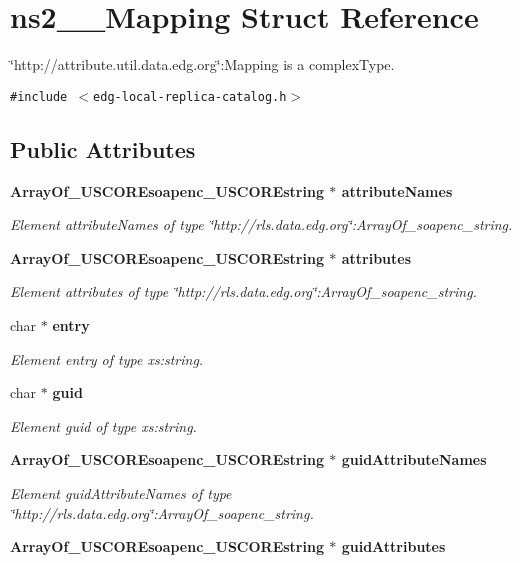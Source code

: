 \section{ns2\_\-\_\-Mapping Struct Reference}
\label{structns2____Mapping}
\char`\"{}http://attribute.util.data.edg.org\char`\"{}:Mapping is a complex\-Type.  


{\tt \#include $<$edg-local-replica-catalog.h$>$}

\subsection*{Public Attributes}
\begin{CompactItemize}
\item 
\bf{Array\-Of\_\-USCOREsoapenc\_\-USCOREstring} $\ast$ \bf{attribute\-Names}
\begin{CompactList}\small\item\em Element attribute\-Names of type \char`\"{}http://rls.data.edg.org\char`\"{}:Array\-Of\_\-soapenc\_\-string. \item\end{CompactList}\item 
\bf{Array\-Of\_\-USCOREsoapenc\_\-USCOREstring} $\ast$ \bf{attributes}
\begin{CompactList}\small\item\em Element attributes of type \char`\"{}http://rls.data.edg.org\char`\"{}:Array\-Of\_\-soapenc\_\-string. \item\end{CompactList}\item 
char $\ast$ \bf{entry}
\begin{CompactList}\small\item\em Element entry of type xs:string. \item\end{CompactList}\item 
char $\ast$ \bf{guid}
\begin{CompactList}\small\item\em Element guid of type xs:string. \item\end{CompactList}\item 
\bf{Array\-Of\_\-USCOREsoapenc\_\-USCOREstring} $\ast$ \bf{guid\-Attribute\-Names}
\begin{CompactList}\small\item\em Element guid\-Attribute\-Names of type \char`\"{}http://rls.data.edg.org\char`\"{}:Array\-Of\_\-soapenc\_\-string. \item\end{CompactList}\item 
\bf{Array\-Of\_\-USCOREsoapenc\_\-USCOREstring} $\ast$ \bf{guid\-Attributes}\label{structns2____Mapping_6d621ef8882153203d71881540f88177}


\end{CompactItemize}
